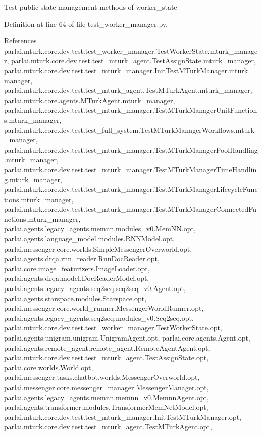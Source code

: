 \begin{DoxyVerb}Test public state management methods of worker_state\end{DoxyVerb}
 

Definition at line 64 of file test\+\_\+worker\+\_\+manager.\+py.



References parlai.\+mturk.\+core.\+dev.\+test.\+test\+\_\+worker\+\_\+manager.\+Test\+Worker\+State.\+mturk\+\_\+manager, parlai.\+mturk.\+core.\+dev.\+test.\+test\+\_\+mturk\+\_\+agent.\+Test\+Assign\+State.\+mturk\+\_\+manager, parlai.\+mturk.\+core.\+dev.\+test.\+test\+\_\+mturk\+\_\+manager.\+Init\+Test\+M\+Turk\+Manager.\+mturk\+\_\+manager, parlai.\+mturk.\+core.\+dev.\+test.\+test\+\_\+mturk\+\_\+agent.\+Test\+M\+Turk\+Agent.\+mturk\+\_\+manager, parlai.\+mturk.\+core.\+agents.\+M\+Turk\+Agent.\+mturk\+\_\+manager, parlai.\+mturk.\+core.\+dev.\+test.\+test\+\_\+mturk\+\_\+manager.\+Test\+M\+Turk\+Manager\+Unit\+Functions.\+mturk\+\_\+manager, parlai.\+mturk.\+core.\+dev.\+test.\+test\+\_\+full\+\_\+system.\+Test\+M\+Turk\+Manager\+Workflows.\+mturk\+\_\+manager, parlai.\+mturk.\+core.\+dev.\+test.\+test\+\_\+mturk\+\_\+manager.\+Test\+M\+Turk\+Manager\+Pool\+Handling.\+mturk\+\_\+manager, parlai.\+mturk.\+core.\+dev.\+test.\+test\+\_\+mturk\+\_\+manager.\+Test\+M\+Turk\+Manager\+Time\+Handling.\+mturk\+\_\+manager, parlai.\+mturk.\+core.\+dev.\+test.\+test\+\_\+mturk\+\_\+manager.\+Test\+M\+Turk\+Manager\+Lifecycle\+Functions.\+mturk\+\_\+manager, parlai.\+mturk.\+core.\+dev.\+test.\+test\+\_\+mturk\+\_\+manager.\+Test\+M\+Turk\+Manager\+Connected\+Functions.\+mturk\+\_\+manager, parlai.\+agents.\+legacy\+\_\+agents.\+memnn.\+modules\+\_\+v0.\+Mem\+N\+N.\+opt, parlai.\+agents.\+language\+\_\+model.\+modules.\+R\+N\+N\+Model.\+opt, parlai.\+messenger.\+core.\+worlds.\+Simple\+Messenger\+Overworld.\+opt, parlai.\+agents.\+drqa.\+rnn\+\_\+reader.\+Rnn\+Doc\+Reader.\+opt, parlai.\+core.\+image\+\_\+featurizers.\+Image\+Loader.\+opt, parlai.\+agents.\+drqa.\+model.\+Doc\+Reader\+Model.\+opt, parlai.\+agents.\+legacy\+\_\+agents.\+seq2seq.\+seq2seq\+\_\+v0.\+Agent.\+opt, parlai.\+agents.\+starspace.\+modules.\+Starspace.\+opt, parlai.\+messenger.\+core.\+world\+\_\+runner.\+Messenger\+World\+Runner.\+opt, parlai.\+agents.\+legacy\+\_\+agents.\+seq2seq.\+modules\+\_\+v0.\+Seq2seq.\+opt, parlai.\+mturk.\+core.\+dev.\+test.\+test\+\_\+worker\+\_\+manager.\+Test\+Worker\+State.\+opt, parlai.\+agents.\+unigram.\+unigram.\+Unigram\+Agent.\+opt, parlai.\+core.\+agents.\+Agent.\+opt, parlai.\+agents.\+remote\+\_\+agent.\+remote\+\_\+agent.\+Remote\+Agent\+Agent.\+opt, parlai.\+mturk.\+core.\+dev.\+test.\+test\+\_\+mturk\+\_\+agent.\+Test\+Assign\+State.\+opt, parlai.\+core.\+worlds.\+World.\+opt, parlai.\+messenger.\+tasks.\+chatbot.\+worlds.\+Messenger\+Overworld.\+opt, parlai.\+messenger.\+core.\+messenger\+\_\+manager.\+Messenger\+Manager.\+opt, parlai.\+agents.\+legacy\+\_\+agents.\+memnn.\+memnn\+\_\+v0.\+Memnn\+Agent.\+opt, parlai.\+agents.\+transformer.\+modules.\+Transformer\+Mem\+Net\+Model.\+opt, parlai.\+mturk.\+core.\+dev.\+test.\+test\+\_\+mturk\+\_\+manager.\+Init\+Test\+M\+Turk\+Manager.\+opt, parlai.\+mturk.\+core.\+dev.\+test.\+test\+\_\+mturk\+\_\+agent.\+Test\+M\+Turk\+Agent.\+opt, 